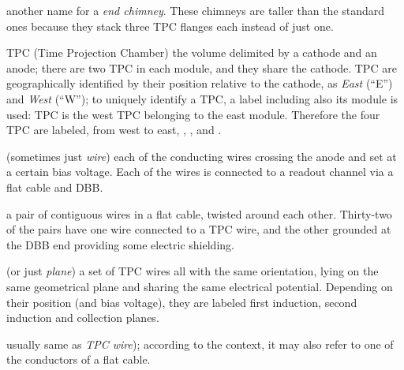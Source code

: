\begin{description}
  \item[Tall chimney]
    another name for a \emph{end chimney}. These chimneys are taller than the
    standard ones because they stack three TPC flanges each instead of just one.

  \item{TPC}
    (Time Projection Chamber) the volume delimited by a cathode and an
    anode; there are two TPC in each module, and they share the cathode.
    TPC are geographically identified by their position relative to the cathode,
    as \emph{East} (``E'') and \emph{West} (``W''); to uniquely identify a TPC,
    a label including also its module is used: TPC  is the west TPC
    belonging to the east module. Therefore the four TPC are labeled, from west
    to east, , ,  and .

  \item[TPC wire]
    (sometimes just \emph{wire}) each of the conducting wires
    crossing the anode and set at a certain bias voltage.
    Each of the wires is connected to a readout channel via a flat cable and DBB.

  \item[Twisted pair]
    a pair of contiguous wires in a flat cable, twisted around
    each other. Thirty-two of the pairs have one wire connected to a TPC wire,
    and the other grounded at the DBB end providing some electric shielding.

  \item[Wire plane]
    (or just \emph{plane}) a set of TPC wires all with the same
    orientation, lying on the same geometrical plane and sharing the same
    electrical potential.
    Depending on their position (and bias voltage), they are labeled first
    induction, second induction and collection planes.

  \item[Wire]
    usually same as \emph{TPC wire}); according to the context,
    it may also refer to one of the conductors of a flat cable.

\end{description}

